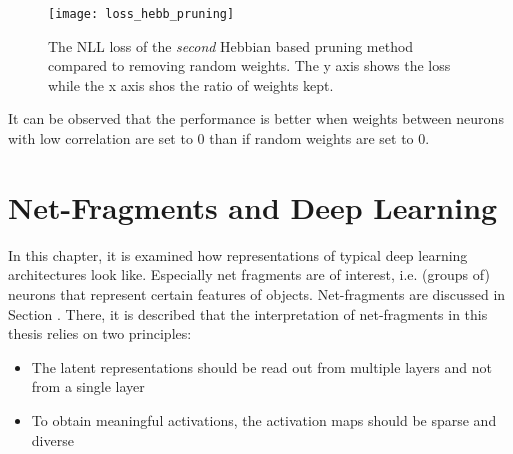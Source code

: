 \begin{figure}[h]
    \centering
    \texttt{[image: loss\_hebb\_pruning]}
    \caption[NLL Loss of Hebbian Pruning]{The NLL loss of the \emph{second} Hebbian based pruning method compared to removing random weights. The y axis shows the loss while the x axis shos the ratio of weights kept. }
\end{figure}

It can be observed that the performance is better when weights between neurons with low correlation are set to \(0\) than if random weights are set to \(0\).


\pagebreak
\chapter{Net-Fragments and Deep Learning}
In this chapter, it is examined how representations of typical deep learning architectures look like.
Especially net fragments are of interest, i.e. (groups of) neurons that represent certain features of objects.
Net-fragments are discussed in Section .
There, it is described that the interpretation of net-fragments in this thesis relies on two principles:

\begin{itemize}
	\item The latent representations should be read out from multiple layers and not from a single layer
	\item To obtain meaningful activations, the activation maps should be sparse and diverse
\end{itemize}



